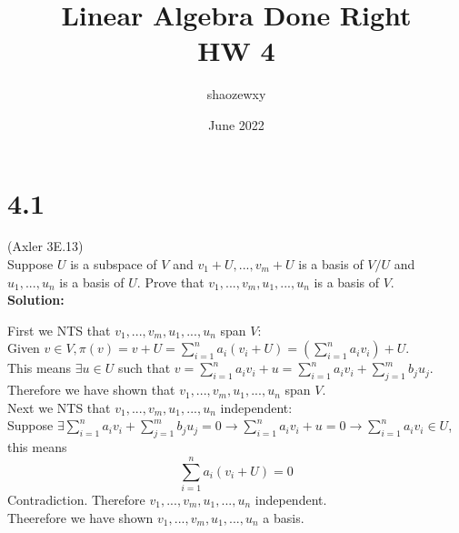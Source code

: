 \documentclass{article}
\title{Linear Algebra Done Right\\
\large{HW 4}}
\author{shaozewxy }
\date{June 2022}
\begin{document}
\maketitle

\setcounter{secnumdepth}{0}
\section*{4.1}
(Axler 3E.13)\\
Suppose $U$ is a subspace of $V$ and $v_1+U, ..., v_m+U$ is a basis of $V/U$ and $u_1, ..., u_n$ is a basis of $U$. Prove that $v_1, ..., v_m, u_1, ..., u_n$ is a basis of $V$.\\
\textbf{Solution:}
\begin{addmargin}[1em]{0em}
    First we NTS that $v_1, ..., v_m, u_1, ..., u_n$ span $V$:\\
    Given $v \in V, \pi(v) = v+U = \sum_{i=1}^{n}a_i(v_i+U) = \left(\sum_{i=1}^{n}a_iv_i\right)+U$.\\
    This means $\exists u \in U$ such that $v = \sum_{i=1}^{n}a_iv_i + u = \sum_{i=1}^{n}a_iv_i + \sum_{j=1}^{m}b_ju_j$.\\
    Therefore we have shown that $v_1, ..., v_m, u_1, ..., u_n$ span $V$.\\
    Next we NTS that $v_1, ..., v_m, u_1, ..., u_n$ independent:\\
    Suppose $\exists \sum_{i=1}^{n}a_iv_i + \sum_{j=1}^{m}b_ju_j = 0 \rightarrow \sum_{i=1}^{n}a_iv_i + u = 0 \rightarrow \sum_{i=1}^{n} a_iv_i \in U$, this means
    \begin{equation*}
        \sum_{i=1}^{n} a_i \left(v_i + U\right) = 0
    \end{equation*}
    Contradiction. Therefore $v_1, ..., v_m, u_1, ..., u_n$ independent.\\
    Theerefore we have shown $v_1, ..., v_m, u_1, ..., u_n$ a basis.
\end{addmargin}
\end{document}
